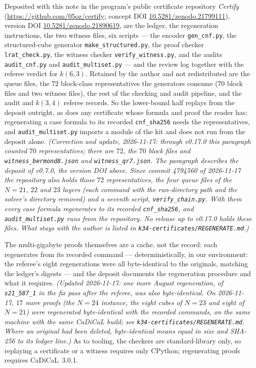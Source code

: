 \documentclass[11pt]{amsart}
\theoremstyle{plain}
\theoremstyle{definition}
\theoremstyle{remark}
\begin{document}
Deposited with this note in the program's public certificate
repository \emph{Certify} (\url{https://github.com/05oz/certify};
concept DOI \href{https://doi.org/10.5281/zenodo.21799111}%
{10.5281/zenodo.21799111}), version DOI
\href{https://doi.org/10.5281/zenodo.21890619}{10.5281/zenodo.21890619},
are the ledger, the regeneration instructions, the two witness files,
six scripts --- the encoder \texttt{gen\_cnf.py}, the structured-cube
generator \texttt{make\_structured.py}, the proof checker
\texttt{lrat\_check.py}, the witness checker
\texttt{verify\_witness.py}, and the audits \texttt{audit\_cnf.py} and
\texttt{audit\_multiset.py} --- and the review log together with the
referee verdict for $k(6,3)$. Retained by the author and not
redistributed are the queue files, the $72$ block-class representatives
the generators consume ($70$ block files and two witness files), the
rest of the checking and audit pipeline, and
the audit and $k(3,4)$ referee records. So the lower-bound half replays
from the deposit outright, as does any certificate whose formula and
proof the reader has; regenerating a case formula to its recorded
\texttt{cnf\_sha256} needs the representatives, and
\texttt{audit\_multiset.py} imports a module of the kit and does not run
from the deposit alone. \emph{(Correction and update, 2026-11-17: through
v0.17.0 this paragraph counted $70$ representatives; there are $72$, the
$70$ block files and \texttt{witness\_bermond8.json} and
\texttt{witness\_qr7.json}. The paragraph describes the deposit of
v0.7.0, the version DOI above. Since commit 4794560 of 2026-11-17 the
repository also holds those $72$ representatives, the four queue files of
the $N=21$, $22$ and $23$ layers (each command with the run-directory path
and the solver's directory removed) and a seventh script,
\texttt{verify\_chain.py}. With them every case formula regenerates to its
recorded \texttt{cnf\_sha256}, and \texttt{audit\_multiset.py} runs from
the repository. No release up to v0.17.0 holds these files. What stays
with the author is listed in \texttt{k34-certificates/REGENERATE.md}.)}

The multi-gigabyte proofs themselves are a cache, not the record: each
regenerates from its recorded command --- deterministically, in our
environment: the referee's eight regenerations were all byte-identical
to the originals, matching the ledger's digests --- and the deposit
documents the regeneration procedure and what it requires.
\emph{(Updated 2026-11-17: one more August regeneration, of
\texttt{s21\_587\_1} in the fix pass after the referee, was also
byte-identical. On 2026-11-17, $17$ more proofs (the $N=24$ instance, the
eight cubes of $N=23$ and eight of $N=21$) were regenerated byte-identical
with the recorded commands, on the same machine with the same CaDiCaL
build; see \texttt{k34-certificates/REGENERATE.md}. Where an original had
been deleted, byte-identical means equal in size and SHA-256 to its ledger
line.)} As to
tooling, the checkers are standard-library only, so replaying a
certificate or a witness requires only CPython; regenerating proofs
requires CaDiCaL~3.0.1.
\end{document}
